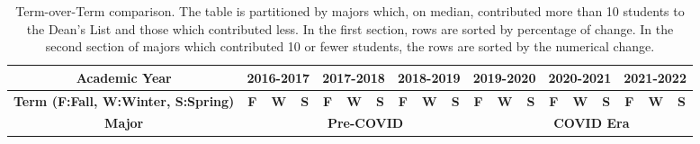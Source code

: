 \documentclass[10pt]{article}
\begin{document}
\begin{landscape}
\tiny
\begin{longtable}[c]{|ccccccccccccccccccc|}
	\caption{Term-over-Term comparison. The table is partitioned by majors which, on median, contributed more than 10 students to the Dean's List and those which contributed less.  In the first section, rows are sorted by percentage of change. In the second section of majors which contributed 10 or fewer students, the rows are sorted by the numerical change.}
	\label{tab:term-over-term-numbers}\\
	\hline
	\multicolumn{1}{|c|}{\textbf{Academic Year}}                     & \multicolumn{3}{c|}{\textbf{2016-2017}}                                                             & \multicolumn{3}{c|}{\textbf{2017-2018}}                                                             & \multicolumn{3}{c|}{\textbf{2018-2019}}                                                             & \multicolumn{3}{c|}{\textbf{2019-2020}}                                                             & \multicolumn{3}{c|}{\textbf{2020-2021}}                                                             & \multicolumn{3}{c|}{\textbf{2021-2022}}                                        \\ \hline
	\endhead
	\multicolumn{1}{|c|}{\textbf{Term (F:Fall, W:Winter, S:Spring)}} & \multicolumn{1}{c|}{\textbf{F}} & \multicolumn{1}{c|}{\textbf{W}} & \multicolumn{1}{c|}{\textbf{S}} & \multicolumn{1}{c|}{\textbf{F}} & \multicolumn{1}{c|}{\textbf{W}} & \multicolumn{1}{c|}{\textbf{S}} & \multicolumn{1}{c|}{\textbf{F}} & \multicolumn{1}{c|}{\textbf{W}} & \multicolumn{1}{c|}{\textbf{S}} & \multicolumn{1}{c|}{\textbf{F}} & \multicolumn{1}{c|}{\textbf{W}} & \multicolumn{1}{c|}{\textbf{S}} & \multicolumn{1}{c|}{\textbf{F}} & \multicolumn{1}{c|}{\textbf{W}} & \multicolumn{1}{c|}{\textbf{S}} & \multicolumn{1}{c|}{\textbf{F}} & \multicolumn{1}{c|}{\textbf{W}} & \textbf{S} \\ \hline
	\multicolumn{1}{|c|}{\textbf{Major}}                             & \multicolumn{10}{c|}{\textbf{Pre-COVID}}                                                                                                                                                                                                                                                                                                          & \multicolumn{8}{c|}{\textbf{COVID Era}}                                                                                                                                                                                                                  \\ \hline

\end{longtable}
\end{landscape}
\end{document}
